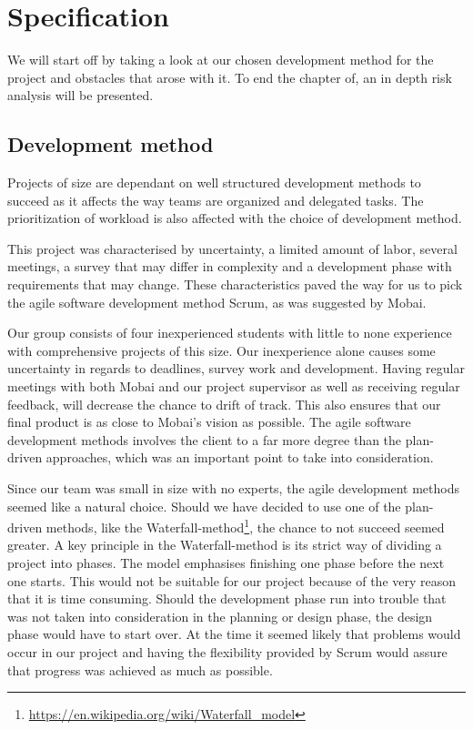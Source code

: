 \chapter{Specification}
\label{chap:Specification}
We will start off by taking a look at our chosen development method for the project and obstacles that arose with it. To end the chapter of, an in depth risk analysis will be presented.

\section{Development method}
Projects of size are dependant on well structured development methods to succeed as it affects the way teams are organized and delegated tasks. The prioritization of workload is also affected with the choice of development method. 

This project was characterised by uncertainty, a limited amount of labor, several meetings, a survey that may differ in complexity and a development phase with requirements that may change. These characteristics paved the way for us to pick the agile software development method Scrum, as was suggested by Mobai. 

Our group consists of four inexperienced students with little to none experience with comprehensive projects of this size. Our inexperience alone causes some uncertainty in regards to deadlines, survey work and development. Having regular meetings with both Mobai and our project supervisor as well as receiving regular feedback, will decrease the chance to drift of track. This also ensures that our final product is as close to Mobai's vision as possible. The agile software development methods involves the client to a far more degree than the plan-driven approaches, which was an important point to take into consideration.

Since our team was small in size with no experts, the agile development methods seemed like a natural choice. Should we have decided to use one of the plan-driven methods, like the Waterfall-method\footnote{\url{https://en.wikipedia.org/wiki/Waterfall_model}}, the chance to not succeed seemed greater. A key principle in the Waterfall-method is its strict way of dividing a project into phases. The model emphasises finishing one phase before the next one starts. This would not be suitable for our project because of the very reason that it is time consuming. Should the development phase run into trouble that was not taken into consideration in the planning or design phase, the design phase would have to start over. At the time it seemed likely that problems would occur in our project and having the flexibility provided by Scrum would assure that progress was achieved as much as possible. 

